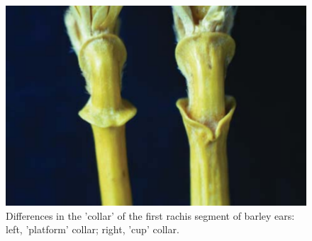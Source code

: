 \documentclass[ignorenonframetext,aspectratio=169]{beamer}
\begin{document}
\begin{frame}{}
\protect\hypertarget{section-3}{}

\begin{figure}
\includegraphics[width=0.45\linewidth]{../images/rachis_barley_collar} \caption{Differences in the 'collar' of the first rachis segment of barley ears: left, 'platform' collar; right, 'cup' collar.}\label{fig:rachis-collar-barley}
\end{figure}

\end{frame}
\end{document}
